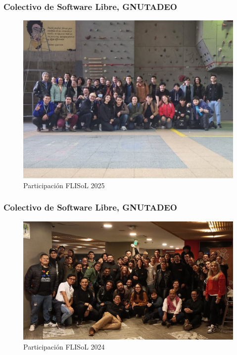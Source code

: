 \documentclass[17pt, t, lualatex]{beamer}
\begin{document}
\begin{frame}
  \frametitle{Colectivo de Software Libre, GNUTADEO}
  \begin{figure}
    \centering
    \includegraphics[height=0.85\textheight]{img/FLISOL2025.jpg}
    \caption{Participación FLISoL 2025}
  \end{figure}
\end{frame}

\begin{frame}
  \frametitle{Colectivo de Software Libre, GNUTADEO}
  \begin{figure}
    \centering
    \includegraphics[height=0.85\textheight]{img/FLISOL2024.jpg}
    \caption{Participación FLISoL 2024}
  \end{figure}
\end{frame}
\end{document}
